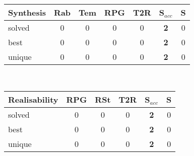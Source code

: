 \begin{tabular}{|p{5em}||c|c|c|c||c|c|}\hline
Synthesis & Rab & Tem & RPG & T2R & S$_{\textit{acc}}$ & S \\\hline
    solved & 0 & 0 & 0 & 0 & \textbf{2} & 0\\
    best & 0 & 0 & 0 & 0 & \textbf{2} & 0\\
    unique & 0 & 0 & 0 & 0 & \textbf{2} & 0\\\hline
\end{tabular}\\
\begin{tabular}{|p{6.2em}||c|c|c||c|c|}\hline
Realisability & RPG & RSt & T2R & S$_{\textit{acc}}$ & S \\\hline
    solved & 0 & 0 & 0 & \textbf{2} & 0\\
    best & 0 & 0 & 0 & \textbf{2} & 0\\
    unique & 0 & 0 & 0 & \textbf{2} & 0\\\hline
\end{tabular}
